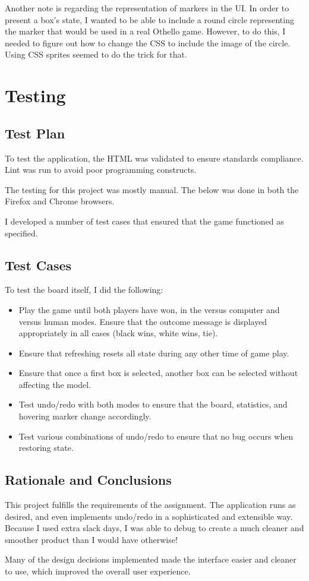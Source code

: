 \documentclass[11pt,letterpaper]{article}
\begin{document}
Another note is regarding the representation of markers in the UI. In order to present a box's state, I wanted to be able to include a round circle representing the marker that would be used in a real Othello game. However, to do this, I needed to figure out how to change the CSS to include the image of the circle. Using CSS sprites seemed to do the trick for that.
\section{Testing}

\subsection{Test Plan}
To test the application, the HTML was validated to ensure standards compliance. Lint was run to avoid poor programming constructs.

The testing for this project was mostly manual. The below was done in both the Firefox and Chrome browsers.

I developed a number of test cases that ensured that the game functioned as specified.

\subsection{Test Cases}
To test the board itself, I did the following:
\begin{itemize}
\item Play the game until both players have won, in the versus computer and versus human modes. Ensure that the outcome message is displayed appropriately in all cases (black wins, white wins, tie).
\item Ensure that refreshing resets all state during any other time of game play.
\item Ensure that once a first box is selected, another box can be selected without affecting the model.
\item Test undo/redo with both modes to ensure that the board, statistics, and hovering marker change accordingly.
\item Test various combinations of undo/redo to ensure that no bug occurs when restoring state.
\end{itemize}

\subsection{Rationale and Conclusions}
This project fulfills the requirements of the assignment. The application runs as desired, and even implements undo/redo in a sophisticated and extensible way. Because I used extra slack days, I was able to debug to create a much cleaner and smoother product than I would have otherwise!

Many of the design decisions implemented made the interface easier and cleaner to use, which improved the overall user experience.
\end{document}
